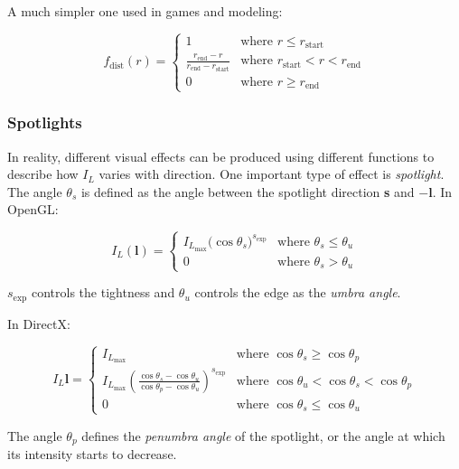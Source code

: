 \documentclass[10pt, a4paper]{article}
\begin{document}
            A much simpler one used in games and modeling: 

            $$
            f_{\text{dist}}(r)=
                \begin{cases}
                    1 & \text{where } r \leqslant r_{\text{start}}\\
                    \frac{r_{\text{end}} - r}{r_{\text{end}} - r_{\text{start}}} & \text{where } r_{\text{start}} < r < r_{\text{end}}\\
                    0 & \text{where } r \geqslant r_{\text{end}} 
                \end{cases}
            $$

        \subsubsection{Spotlights}
            In reality, different visual effects can be produced using different functions to describe how $I_L$ varies with direction. One important type of effect is \emph{spotlight}. The angle $\theta_s$ is defined as the angle between the spotlight direction \textbf{s} and $-\textbf{l}$. In OpenGL: 

            $$
            I_L(\textbf{l}) = \begin{cases}
                I_{L_{\text{max}}}(\cos{\theta_s)}^{s_{\text{exp}}} & \text{where } \theta_s \leqslant \theta_u \\
                0 & \text{where } \theta_s > \theta_u
            \end{cases} 
            $$

            $s_{\text{exp}}$ controls the tightness and $\theta_u$ controls the edge as the \emph{umbra angle}.
        
            In DirectX: 

            $$
            I_L{\textbf{l}} = \begin{cases}
                I_{L_{\text{max}}} & \text{where } \cos{\theta_s} \geqslant \cos{\theta_p} \\
                I_{L_{\text{max}}} (\frac{\cos{\theta_s} - \cos{\theta_u}}{\cos{\theta_p} - \cos{\theta_u}})^{s_{\text{exp}}} & \text{where } \cos{\theta_u} < \cos{\theta_s} < \cos{\theta_p} \\
                0 & \text{where } \cos{\theta_s} \leqslant \cos{\theta_u}
            \end{cases}
            $$

            The angle $\theta_p$ defines the \emph{penumbra angle} of the spotlight, or the angle at which its intensity starts to decrease. 
\end{document}

